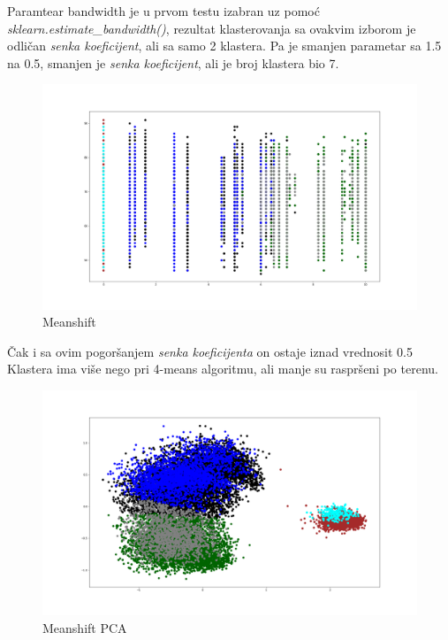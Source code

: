 \documentclass[a4paper, 11pt]{article}
\begin{document}
Paramtear bandwidth je u prvom testu izabran uz pomo\'{c}
\emph{sklearn.estimate\_bandwidth()}, rezultat klasterovanja
sa ovakvim izborom je odli\v{c}an \emph{senka koeficijent},
ali sa samo 2 klastera.
Pa je smanjen parametar sa 1.5 na 0.5, smanjen je \emph{senka
koeficijent}, ali je broj klastera bio 7.


\begin{figure}[h]
\centering
\graphicspath{{../}}
\includegraphics[scale=0.2]{meanshift_bandwith05.png}
\caption{Meanshift}
\end{figure}

\v{C}ak i sa ovim pogor\v{s}anjem \emph{senka koeficijenta}
on ostaje iznad vrednosit 0.5
Klastera ima vi\v{s}e nego pri 4-means algoritmu, ali 
manje su raspr\v{s}eni po terenu.

\begin{figure}[h]
\centering
\graphicspath{{../}}
\includegraphics[scale=0.2]{meanshift_bandwith05_pca.png}
\caption{Meanshift PCA}
\end{figure}
\end{document}
